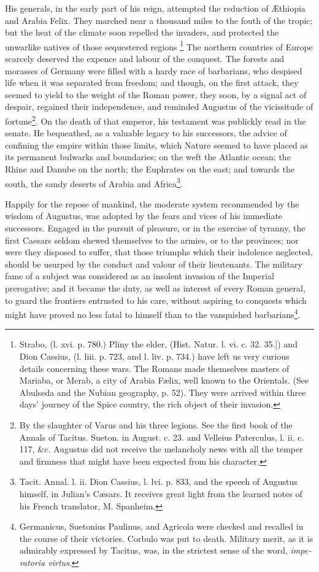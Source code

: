 His generals, in the early part of his reign, attempted the reduction of Æthiopia and Arabia Felix. They marched near a thousand miles to the fouth of the tropic; but the heat of the climate soon repelled the invaders, and protected the unwarlike natives of those sequestered regions \footnote{ Strabo, (l. xvi. p. 780.) Pliny the elder, (Hist. Natur. l. vi. c. 32. 35.]) and Dion Cassius, (l. liii. p. 723, and l. liv. p. 734.) have left us very curious details concerning these wars. The Romans made themselves masters of Mariaba, or Merab, a city of Arabia Fælix, well known to the Orientals. (See Abulseda and the Nubian geography, p. 52). They were arrived within three days’ journey of the Spice country, the rich object of their invasion.} The northern countries of Europe scarcely deserved the expence and labour of the conquest. The forests and morasses of Germany were filled with a hardy race of barbarians, who despised life when it was separated from freedom; and though, on the first attack, they seemed to yield to the weight of the Roman power, they soon, by a signal act of despair, regained their independence, and reminded Augustus of the vicissitude of fortune\footnote{By the slaughter of Varus and his three legions. See the first book of the Annals of Tacitus. Sueton. in August. c. 23. and Velleius Paterculus, l. ii. c. 117, \&c. Augustus did not receive the melancholy news with all the temper and firmness that might have been expected from his character.}. On the death of that emperor, his testament was publickly read in the senate. He bequeathed, as a valuable legacy to his successors, the advice of confining the empire within those limits, which Nature seemed to have placed as its permanent bulwarks and boundaries; on the weft the Atlantic ocean; the Rhine and Danube on the north; the Euphrates on the east; and towards the south, the sandy deserts of Arabia and Africa\footnote{Tacit. Annal. l. ii. Dion Cassius, l. lvi. p. 833, and the speech of Augustus himself, in Julian’s Cæsars. It receives great light from the learned notes of his French translator, M. Spanheim.}.

Happily for the repose of mankind, the moderate system recommended by the wisdom of Augustus, was adopted by the fears and vices of his immediate successors. Engaged in the pursuit of pleasure, or in the exercise of tyranny, the first Caesars seldom shewed themselves to the armies, or to the provinces; nor were they disposed to suffer, that those triumphs which their indolence neglected, should be usurped by the conduct and valour of their lieutenants. The military fame of a subject was considered as an insolent invasion of the Imperial prerogative; and it became the duty, as well as interest of every Roman general, to guard the frontiers entrusted to his care, without aspiring to conquests which might have proved no less fatal to himself than to the vanquished barbarians\footnote{Germanicus, Suetonius Paulinus, and Agricola were checked and recalled in the course of their victories. Corbulo was put to death. Military merit, as it is admirably expressed by Tacitus, was, in the strictest sense of the word, \emph{\foreignlanguage{latin}{imperatoria virtus}}.}.

